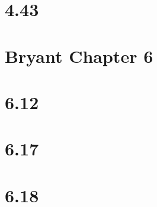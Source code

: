 \documentclass{article}
\begin{document}
\section*{4.43}


\section*{Bryant Chapter 6}

\section*{6.12}


\section*{6.17}


\section*{6.18}
\end{document}
